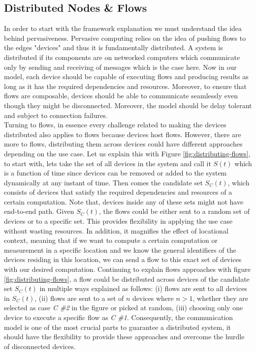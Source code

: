 \subsection{Distributed Nodes \& Flows}
In order to start with the framework explanation we must understand the idea behind pervasiveness. Pervasive computing relies on the idea of pushing flows to the edges "devices" and thus it is fundamentally distributed. A system is distributed if its components  are on networked computers which communicate only by sending and receiving of messages \cite{DSYS} which is the case here. Now in our model, each device should be capable of executing flows and producing results as long as it has the required dependencies and resources. Moreover, to ensure that flows are composable, devices should be able to communicate seamlessly even though they might be disconnected. Moreover, the model should be delay tolerant and subject to connection failures.\\



\noindent Turning to flows, in essence every challenge related to making the devices distributed also applies to flows because devices host flows. However, there are more to flows, distributing them across devices could have different approaches depending on the use case. Let us explain this with Figure \ref{fig:distributing-flows}, to start with, lets take the set of all devices in the system and call it \(S(t)\) which is a function of time since devices can be removed or added to the system dynamically at any instant of time. Then comes the candidate set \(S_C(t)\), which consists of devices that satisfy the required dependencies and resources of a certain computation. Note that, devices inside any of these sets might not have end-to-end path. Given \(S_C(t)\), the flows could be either sent to a random set of devices or to a specific set. This provides flexibility in applying the use case without wasting resources. In addition, it magnifies the effect of locational context, meaning that if we want to compute a certain computation or measurement in a specific location  and we know the general identifiers of  the  devices residing in this location, we can send a flow to this exact set of devices with our desired computation. Continuing to explain flows approaches with figure \ref{fig:distributing-flows}, a flow could be distributed across devices of the candidate set  \(S_C(t)\) in multiple ways explained as follows: (i) flows are sent to all devices in  \(S_C(t)\), (ii) flows are sent to a set of  \(n\)  devices where \(n > 1\), whether they are selected as case \textit{C \#2} in the figure or picked at random, (iii) choosing only one device to execute a specific flow as \textit{C \#1}. Consequently, the communication model is one of the most crucial parts to guarantee a distributed system, it should have the flexibility to provide these approaches and overcome the hurdle of disconnected devices.
 
